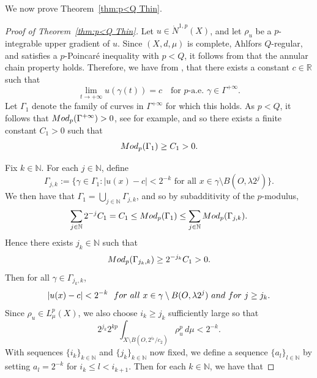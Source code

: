 \documentclass[10pt]{amsart}
\numberwithin{equation}{section}
\newcommand{\Mod}{{\rm Mod}}
\newcommand{\N}{\mathbb{N}}
\newcommand{\R}{\mathbb{R}}
\begin{document}

We now prove Theorem~\ref{thm:p<Q Thin}.

\begin{proof}[Proof of Theorem~\ref{thm:p<Q Thin}]
    Let $u\in\dot N^{1,p}(X)$, and let $\rho_u$ be a $p$-integrable upper gradient of $u$. Since $(X,d,\mu)$ is complete, Ahlfors $Q$-regular, and satisfies a $p$-Poincar\'e inequality with $p<Q$, it follows from \cite[Theorem~3.3]{K07} that the annular chain property holds.  Therefore, we have from \cite{KN22}, that there exists a constant $c\in\R$ such that 
    \[    \lim_{t\to+\infty}u(\gamma(t))=c\quad\text{for $p$-a.e.\ }\gamma\in\Gamma^{+\infty}.
    \]
    Let $\Gamma_1$ denote the family of curves in $\Gamma^{+\infty}$ for which this holds.  As $p< Q$, it follows that $\Mod_p(\Gamma^{+\infty})>0$, see \cite[Theorem~1.2]{KN22} for example, and so there exists a finite constant $C_1>0$ such that 
    \begin{equation}\label{eq:25-8-23(6)}
    \Mod_p(\Gamma_1)\ge C_1>0.
    \end{equation}

    Fix $k\in\N$.  For each $j\in\N$, define
    \[
    \Gamma_{j,k}:=\{\gamma\in\Gamma_1:|u(x)-c|<2^{-k}\text{ for all }x\in\gamma\setminus B(O,\lambda2^j)\}.
    \]
    We then have that $\Gamma_1=\bigcup_{j\in\N}\Gamma_{j,k}$, and so by subadditivity of the $p$-modulus, 
    \[
    \sum_{j\in\mathbb N}2^{-j}C_1=C_1\leq {\rm Mod}_p(\Gamma_1)\leq\sum_{j\in\mathbb N}{\rm Mod}_p(\Gamma_{j,k}).
    \]
   Hence there exists $j_k\in\N$ such that 
    \begin{align}\label{eq:1-12-24,1}
        \Mod_p(\Gamma_{j_k,k})\ge 2^{-j_k}C_1>0.
    \end{align}
    Then for all $\gamma\in\Gamma_{j_k,k}$,
    \[
    |u(x)-c|<2^{-k} {\rm \ \ for\ all \ }x\in \gamma\setminus B(O,\lambda 2^j) \ {\rm and \ for \ }j\geq j_k.
    \]
Since $\rho_u\in L^p_\mu(X)$,    we also choose $i_k\ge j_k$ sufficiently large so that
    \begin{equation}\label{eq:(1-25)i_k decay}
        2^{j_k}2^{kp}\int_{X\setminus B(O,2^{i_k}/c_2)}\rho_u^p\,d\mu<2^{-k}.
    \end{equation}
    With sequences $\{i_k\}_{k\in\mathbb N}$ and $\{j_k\}_{k\in\mathbb N}$ now fixed, we define a sequence $\{a_l\}_{l\in\N}$ by setting $a_l=2^{-k}$ for $i_k\le l<i_{k+1}$.
    Then for each $k\in\N$, we have that   
    

\end{proof}
\end{document}
